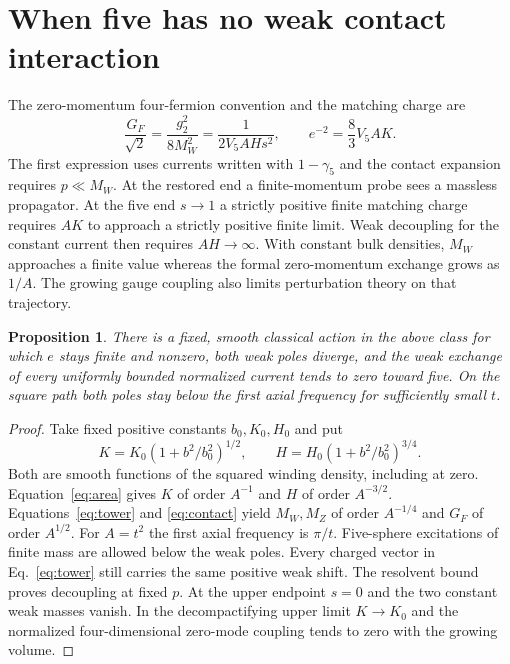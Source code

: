 \documentclass[aps,prd,reprint,onecolumn,nofootinbib,amsmath,amssymb]{revtex4-2}
\newtheorem{proposition}{Proposition}
\begin{document}
\section{When five has no weak contact interaction}
The zero-momentum four-fermion convention and the matching charge are
\begin{equation}
 \frac{G_F}{\sqrt2}=\frac{g_2^2}{8M_W^2}
 =\frac{1}{2V_5 A H s^2},\qquad
 e^{-2}=\frac83 V_5 A K .
 \label{eq:contact}
\end{equation}
The first expression uses currents written with $1-\gamma_5$ and the contact expansion requires $p\ll M_W$. At the restored end a finite-momentum probe sees a massless propagator. At the five end $s\to1$ a strictly positive finite matching charge requires $AK$ to approach a strictly positive finite limit. Weak decoupling for the constant current then requires $AH\to\infty$. With constant bulk densities, $M_W$ approaches a finite value whereas the formal zero-momentum exchange grows as $1/A$. The growing gauge coupling also limits perturbation theory on that trajectory.

\begin{proposition}
There is a fixed, smooth classical action in the above class for which $e$ stays finite and nonzero, both weak poles diverge, and the weak exchange of every uniformly bounded normalized current tends to zero toward five. On the square path both poles stay below the first axial frequency for sufficiently small $t$.
\end{proposition}
\begin{proof}
Take fixed positive constants $b_0,K_0,H_0$ and put
\begin{equation}
 K=K_0(1+b^2/b_0^2)^{1/2},\qquad
 H=H_0(1+b^2/b_0^2)^{3/4}.
\end{equation}
Both are smooth functions of the squared winding density, including at zero. Equation~\eqref{eq:area} gives $K$ of order $A^{-1}$ and $H$ of order $A^{-3/2}$. Equations~\eqref{eq:tower} and \eqref{eq:contact} yield $M_W,M_Z$ of order $A^{-1/4}$ and $G_F$ of order $A^{1/2}$. For $A=t^2$ the first axial frequency is $\pi/t$. Five-sphere excitations of finite mass are allowed below the weak poles. Every charged vector in Eq.~\eqref{eq:tower} still carries the same positive weak shift. The resolvent bound proves decoupling at fixed $p$. At the upper endpoint $s=0$ and the two constant weak masses vanish. In the decompactifying upper limit $K\to K_0$ and the normalized four-dimensional zero-mode coupling tends to zero with the growing volume.
\end{proof}
\end{document}
